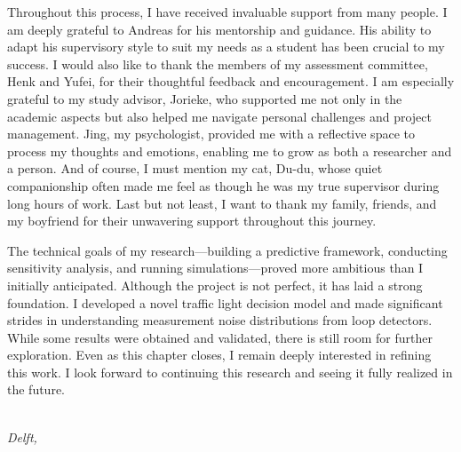 Throughout this process, I have received invaluable support from many people. I am deeply grateful to Andreas for his mentorship and guidance. His ability to adapt his supervisory style to suit my needs as a student has been crucial to my success. I would also like to thank the members of my assessment committee, Henk and Yufei, for their thoughtful feedback and encouragement. I am especially grateful to my study advisor, Jorieke, who supported me not only in the academic aspects but also helped me navigate personal challenges and project management. Jing, my psychologist, provided me with a reflective space to process my thoughts and emotions, enabling me to grow as both a researcher and a person. And of course, I must mention my cat, Du-du, whose quiet companionship often made me feel as though he was my true supervisor during long hours of work. Last but not least, I want to thank my family, friends, and my boyfriend for their unwavering support throughout this journey.

The technical goals of my research—building a predictive framework, conducting sensitivity analysis, and running simulations—proved more ambitious than I initially anticipated. Although the project is not perfect, it has laid a strong foundation. I developed a novel traffic light decision model and made significant strides in understanding measurement noise distributions from loop detectors. While some results were obtained and validated, there is still room for further exploration. Even as this chapter closes, I remain deeply interested in refining this work. I look forward to continuing this research and seeing it fully realized in the future.


\begin{flushright}
{\makeatletter\itshape
    \@author \\
    Delft, \monthname{} \the\year{}
\makeatother}
\end{flushright}
